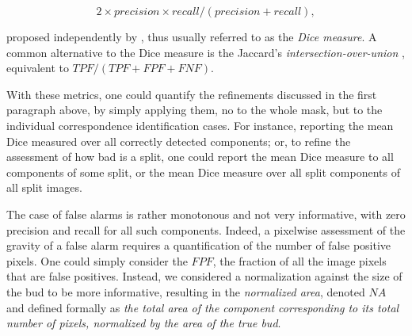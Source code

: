 \documentclass[a4paper,authoryear,review]{elsarticle}
\begin{document}
\begin{equation} 
   2 \times precision \times recall / (precision + recall),
\end{equation}

proposed independently by \citet{dice1945measures}, thus usually referred to as the \emph{Dice measure}. A common alternative to the Dice measure is the  Jaccard’s \emph{intersection-over-union} \citep{jaccard1912distribution}, 
equivalent to $TPF / (TPF+FPF+FNF)$. 

With these metrics, one could quantify the refinements discussed in the first paragraph above, by simply applying them, no to the whole mask, but to the individual correspondence identification cases. For instance, reporting the mean Dice measured over all correctly detected components; or, to refine the assessment of how bad is a split, one could report the mean Dice measure to all components of some split, or the mean Dice measure over all split components of all split images. 

The case of false alarms is rather monotonous and not very informative, with zero precision and recall for all such components. Indeed, a pixelwise assessment of the gravity of a false alarm requires a quantification of the number of false positive pixels. One could simply consider the $FPF$, the fraction of all the image pixels that are false positives. Instead, we considered a normalization against the size of the bud to be more informative, resulting in the \emph{normalized area}, denoted $NA$ and defined formally as  \emph{the total area of the component corresponding to its total number of pixels, normalized by the area of the true bud}. 


\end{document}
